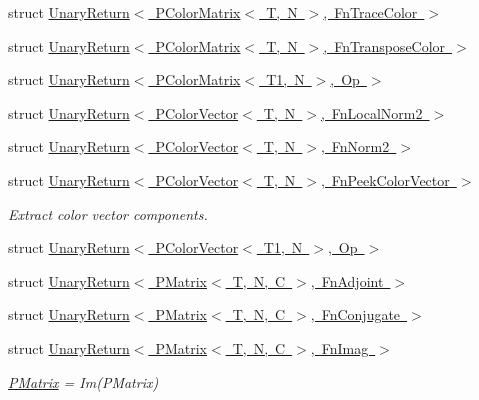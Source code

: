 \begin{DoxyCompactItemize}
\item 
struct \mbox{\hyperlink{structENSEM_1_1UnaryReturn_3_01PColorMatrix_3_01T_00_01N_01_4_00_01FnTraceColor_01_4}{Unary\+Return$<$ P\+Color\+Matrix$<$ T, N $>$, Fn\+Trace\+Color $>$}}
\item 
struct \mbox{\hyperlink{structENSEM_1_1UnaryReturn_3_01PColorMatrix_3_01T_00_01N_01_4_00_01FnTransposeColor_01_4}{Unary\+Return$<$ P\+Color\+Matrix$<$ T, N $>$, Fn\+Transpose\+Color $>$}}
\item 
struct \mbox{\hyperlink{structENSEM_1_1UnaryReturn_3_01PColorMatrix_3_01T1_00_01N_01_4_00_01Op_01_4}{Unary\+Return$<$ P\+Color\+Matrix$<$ T1, N $>$, Op $>$}}
\item 
struct \mbox{\hyperlink{structENSEM_1_1UnaryReturn_3_01PColorVector_3_01T_00_01N_01_4_00_01FnLocalNorm2_01_4}{Unary\+Return$<$ P\+Color\+Vector$<$ T, N $>$, Fn\+Local\+Norm2 $>$}}
\item 
struct \mbox{\hyperlink{structENSEM_1_1UnaryReturn_3_01PColorVector_3_01T_00_01N_01_4_00_01FnNorm2_01_4}{Unary\+Return$<$ P\+Color\+Vector$<$ T, N $>$, Fn\+Norm2 $>$}}
\item 
struct \mbox{\hyperlink{structENSEM_1_1UnaryReturn_3_01PColorVector_3_01T_00_01N_01_4_00_01FnPeekColorVector_01_4}{Unary\+Return$<$ P\+Color\+Vector$<$ T, N $>$, Fn\+Peek\+Color\+Vector $>$}}
\begin{DoxyCompactList}\small\item\em Extract color vector components. \end{DoxyCompactList}\item 
struct \mbox{\hyperlink{structENSEM_1_1UnaryReturn_3_01PColorVector_3_01T1_00_01N_01_4_00_01Op_01_4}{Unary\+Return$<$ P\+Color\+Vector$<$ T1, N $>$, Op $>$}}
\item 
struct \mbox{\hyperlink{structENSEM_1_1UnaryReturn_3_01PMatrix_3_01T_00_01N_00_01C_01_4_00_01FnAdjoint_01_4}{Unary\+Return$<$ P\+Matrix$<$ T, N, C $>$, Fn\+Adjoint $>$}}
\item 
struct \mbox{\hyperlink{structENSEM_1_1UnaryReturn_3_01PMatrix_3_01T_00_01N_00_01C_01_4_00_01FnConjugate_01_4}{Unary\+Return$<$ P\+Matrix$<$ T, N, C $>$, Fn\+Conjugate $>$}}
\item 
struct \mbox{\hyperlink{structENSEM_1_1UnaryReturn_3_01PMatrix_3_01T_00_01N_00_01C_01_4_00_01FnImag_01_4}{Unary\+Return$<$ P\+Matrix$<$ T, N, C $>$, Fn\+Imag $>$}}
\begin{DoxyCompactList}\small\item\em \mbox{\hyperlink{classENSEM_1_1PMatrix}{P\+Matrix}} = Im(\+P\+Matrix) \end{DoxyCompactList}\item 

\end{DoxyCompactItemize}
